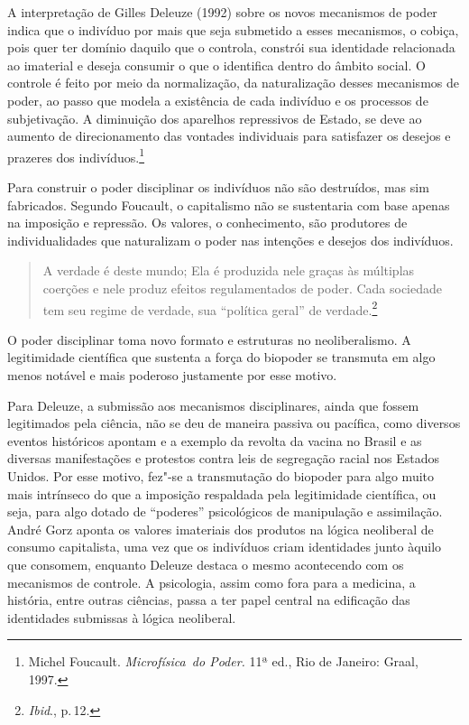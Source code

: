 A interpretação de Gilles Deleuze (1992) sobre os novos mecanismos de
poder indica que o indivíduo por mais que seja submetido a esses
mecanismos, o cobiça, pois quer ter domínio daquilo que o controla,
constrói sua identidade relacionada ao imaterial e deseja consumir o que
o identifica dentro do âmbito social. O controle é feito por meio da
normalização, da naturalização desses mecanismos de poder, ao passo que
modela a existência de cada indivíduo e os processos de subjetivação. A
diminuição dos aparelhos repressivos de Estado, se deve ao aumento de
direcionamento das vontades individuais para satisfazer os desejos e
prazeres dos indivíduos.\footnote{Michel Foucault. \emph{Microfísica~do Poder.} 11ª ed., Rio de Janeiro: Graal, 1997.}

Para construir o poder disciplinar os indivíduos não são destruídos,
mas sim fabricados. Segundo Foucault, o capitalismo não se sustentaria
com base apenas na imposição e repressão. Os valores, o conhecimento,
são produtores de individualidades que naturalizam o poder nas intenções
e desejos dos indivíduos.

\begin{quote}
A verdade é deste mundo; Ela é produzida nele graças às múltiplas
coerções e nele produz efeitos regulamentados de poder. Cada sociedade
tem seu regime de verdade, sua ``política geral'' de verdade.\footnote{\textit{Ibid}., p.\,12.}
\end{quote}

O poder disciplinar toma novo formato e estruturas no neoliberalismo. A
legitimidade científica que sustenta a força do biopoder se transmuta em
algo menos notável e mais poderoso justamente por esse motivo.

Para Deleuze, a submissão aos mecanismos disciplinares, ainda que fossem
legitimados pela ciência, não se deu de maneira passiva ou pacífica,
como diversos eventos históricos apontam e a exemplo da revolta da
vacina no Brasil e as diversas manifestações e protestos contra leis de
segregação racial nos Estados Unidos. Por esse motivo, fez"-se a
transmutação do biopoder para algo muito mais intrínseco do que a
imposição respaldada pela legitimidade científica, ou seja, para algo
dotado de ``poderes'' psicológicos de manipulação e assimilação. André
Gorz aponta os valores imateriais dos produtos na lógica neoliberal de
consumo capitalista, uma vez que os indivíduos criam identidades junto
àquilo que consomem, enquanto Deleuze destaca o mesmo acontecendo com os
mecanismos de controle. A psicologia, assim como fora para a medicina, a
história, entre outras ciências, passa a ter papel central na edificação
das identidades submissas à lógica neoliberal.

